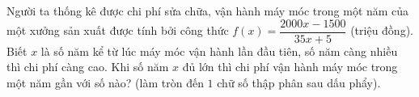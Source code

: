 \begin{bt}%

Người ta thống kê được chi phí sửa chữa, vận hành máy móc trong một năm của một xưởng sản xuất được tính bởi công thức $f(x)=\dfrac{2000x-1500}{35x+5}$ (triệu đồng). Biết $x$ là số năm kể từ lúc máy móc vận hành lần đầu tiên, số năm càng nhiều thì chi phí càng cao. Khi số năm $x$ đủ lớn thì chi phí vận hành máy móc trong một năm gần với số nào? (làm tròn đến $1$ chữ số thập phân sau dấu phẩy).
\end{bt}
